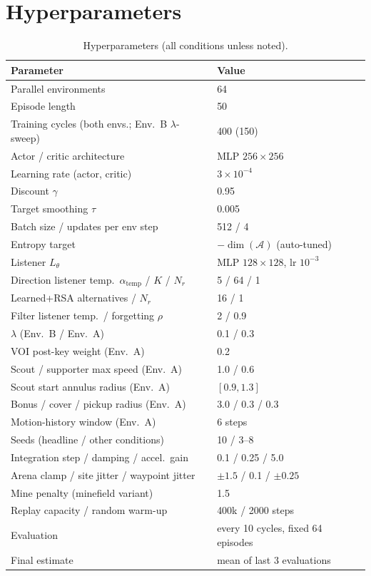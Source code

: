 \documentclass{article}
\newcommand{\Ltheta}{L_\theta}
\begin{document}
\section{Hyperparameters}
\begin{table}[h]
\centering
\caption{Hyperparameters (all conditions unless noted).}
\label{tab:hyperparams}
\begin{tabular}{ll}
\toprule
\textbf{Parameter} & \textbf{Value} \\
\midrule
Parallel environments & 64 \\
Episode length & 50 \\
Training cycles (both envs.; Env.\ B $\lambda$-sweep) & 400 (150) \\
Actor / critic architecture & MLP $256\times256$ \\
Learning rate (actor, critic) & $3\times10^{-4}$ \\
Discount $\gamma$ & 0.95 \\
Target smoothing $\tau$ & 0.005 \\
Batch size / updates per env step & 512 / 4 \\
Entropy target & $-\dim(\mathcal{A})$ (auto-tuned) \\
Listener $\Ltheta$ & MLP $128\times128$, lr $10^{-3}$ \\
Direction listener temp.\ $\alpha_{\text{temp}}$ / $K$ / $N_r$ & 5 / 64 / 1 \\
Learned+RSA alternatives / $N_r$ & 16 / 1 \\
Filter listener temp.\ / forgetting $\rho$ & 2 / 0.9 \\
$\lambda$ (Env.\ B / Env.\ A) & 0.1 / 0.3 \\
VOI post-key weight (Env.\ A) & 0.2 \\
Scout / supporter max speed (Env.\ A) & 1.0 / 0.6 \\
Scout start annulus radius (Env.\ A) & $[0.9, 1.3]$ \\
Bonus / cover / pickup radius (Env.\ A) & 3.0 / 0.3 / 0.3 \\
Motion-history window (Env.\ A) & 6 steps \\
Seeds (headline / other conditions) & 10 / 3--8 \\
Integration step / damping / accel.\ gain & 0.1 / 0.25 / 5.0 \\
Arena clamp / site jitter / waypoint jitter & $\pm1.5$ / 0.1 / $\pm0.25$ \\
Mine penalty (minefield variant) & 1.5 \\
Replay capacity / random warm-up & 400k / 2000 steps \\
Evaluation & every 10 cycles, fixed 64 episodes \\
Final estimate & mean of last 3 evaluations \\
\bottomrule
\end{tabular}
\end{table}
\end{document}
